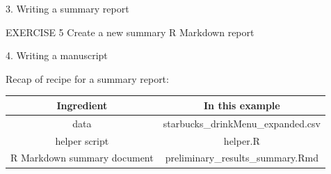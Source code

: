 \documentclass[
  ignorenonframetext,
]{beamer}
\begin{document}
\begin{frame}[fragile]{3. Writing a summary report}
\begin{block}{EXERCISE 5 \textbar{} Create a new summary R Markdown
report}
\end{block}

\end{frame}

\begin{frame}{4. Writing a manuscript}
\protect\hypertarget{writing-a-manuscript}{}

\end{frame}

\begin{frame}

\begin{block}{Recap of recipe for a summary report:}

\begin{longtable}[]{@{}cc@{}}
\toprule
Ingredient & In this example\tabularnewline
\midrule
\endhead
data & starbucks\_drinkMenu\_expanded.csv\tabularnewline
helper script & helper.R\tabularnewline
R Markdown summary document &
preliminary\_results\_summary.Rmd\tabularnewline
\bottomrule
\end{longtable}

\end{block}

\end{frame}
\end{document}
